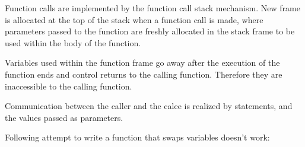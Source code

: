 \documentclass[a4paper,10pt,english]{jupyterBook}
\begin{document}
\sphinxAtStartPar
Function calls are implemented by the function call stack mechanism. New frame is allocated at the top of the stack when a function call is made, where parameters passed to the function are freshly allocated in the stack frame to be used within the body of the function.

\sphinxAtStartPar
Variables used within the function frame go away after the execution of the function ends and control returns to the calling function. Therefore they are inaccessible to the calling function.

\sphinxAtStartPar
Communication between the caller and the calee is realized by  statements, and the values passed as parameters.

\sphinxAtStartPar
Following attempt to write a function that swaps variables doesn’t work:
\end{document}

